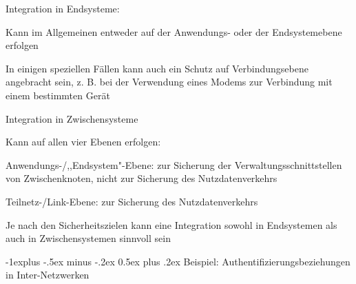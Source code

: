 \documentclass[a4paper]{article}
\makeatletter
\renewcommand{\subsection}{\@startsection{subsection}{2}{0mm}%
 {-1explus -.5ex minus -.2ex}%
 {0.5ex plus .2ex}%
 {\normalfont\normalsize\bfseries}}
\makeatother
\begin{document}
\begin{multicols}{3}
      \begin{itemize*}
            \item Integration in Endsysteme:
            \begin{itemize*}
                  \item Kann im Allgemeinen entweder auf der Anwendungs- oder der Endsystemebene erfolgen
                  \item In einigen speziellen Fällen kann auch ein Schutz auf Verbindungsebene angebracht sein, z. B. bei der Verwendung eines Modems zur Verbindung mit einem bestimmten Gerät
            \end{itemize*}
            \item Integration in Zwischensysteme
            \begin{itemize*}
                  \item Kann auf allen vier Ebenen erfolgen:
                  \begin{itemize*} \item Anwendungs-/,,Endsystem"-Ebene: zur Sicherung der Verwaltungsschnittstellen von Zwischenknoten, nicht zur Sicherung des Nutzdatenverkehrs \item Teilnetz-/Link-Ebene: zur Sicherung des Nutzdatenverkehrs \end{itemize*}
            \end{itemize*}
            \item Je nach den Sicherheitszielen kann eine Integration sowohl in
            Endsystemen als auch in Zwischensystemen sinnvoll sein
      \end{itemize*}


      \subsection{Beispiel: Authentifizierungsbeziehungen in
            Inter-Netzwerken}





\end{multicols}
\end{document}
